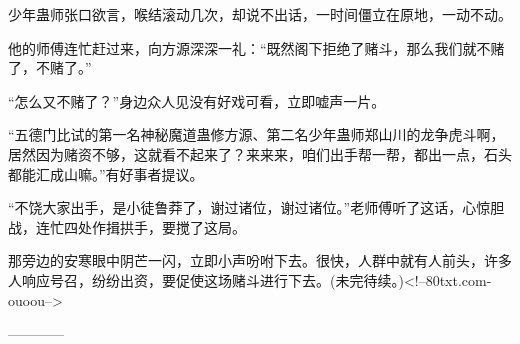 \begin{this_body}
少年蛊师张口欲言，喉结滚动几次，却说不出话，一时间僵立在原地，一动不动。

他的师傅连忙赶过来，向方源深深一礼：“既然阁下拒绝了赌斗，那么我们就不赌了，不赌了。”

“怎么又不赌了？”身边众人见没有好戏可看，立即嘘声一片。

“五德门比试的第一名神秘魔道蛊修方源、第二名少年蛊师郑山川的龙争虎斗啊，居然因为赌资不够，这就看不起来了？来来来，咱们出手帮一帮，都出一点，石头都能汇成山嘛。”有好事者提议。

“不饶大家出手，是小徒鲁莽了，谢过诸位，谢过诸位。”老师傅听了这话，心惊胆战，连忙四处作揖拱手，要搅了这局。

那旁边的安寒眼中阴芒一闪，立即小声吩咐下去。很快，人群中就有人前头，许多人响应号召，纷纷出资，要促使这场赌斗进行下去。(未完待续。)<!--80txt.com-ouoou-->

------------

\end{this_body}

